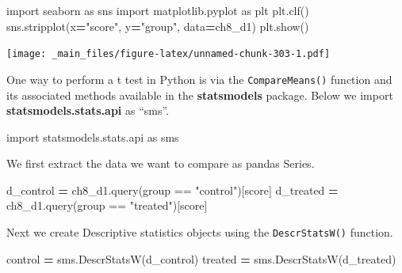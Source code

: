 \documentclass[
]{book}
\newenvironment{Shaded}{\begin{snugshade}}{\end{snugshade}}
\newcommand{\ImportTok}[1]{#1}
\newcommand{\NormalTok}[1]{#1}
\newcommand{\OperatorTok}[1]{\textcolor[rgb]{0.81,0.36,0.00}{\textbf{#1}}}
\newcommand{\StringTok}[1]{\textcolor[rgb]{0.31,0.60,0.02}{#1}}
\begin{document}
\begin{Shaded}
\begin{Highlighting}[]
\ImportTok{import}\NormalTok{ seaborn }\ImportTok{as}\NormalTok{ sns}
\ImportTok{import}\NormalTok{ matplotlib.pyplot }\ImportTok{as}\NormalTok{ plt}
\NormalTok{plt.clf()}
\NormalTok{sns.stripplot(x}\OperatorTok{=}\StringTok{"score"}\NormalTok{, y}\OperatorTok{=}\StringTok{"group"}\NormalTok{, data}\OperatorTok{=}\NormalTok{ch8\_d1)}
\NormalTok{plt.show()}
\end{Highlighting}
\end{Shaded}

\texttt{[image: \_main\_files/figure-latex/unnamed-chunk-303-1.pdf]}

One way to perform a t test in Python is via the \texttt{CompareMeans()} function and its associated methods available in the \textbf{statsmodels} package. Below we import \textbf{statsmodels.stats.api} as ``sms''.

\begin{Shaded}
\begin{Highlighting}[]
\ImportTok{import}\NormalTok{ statsmodels.stats.api }\ImportTok{as}\NormalTok{ sms}
\end{Highlighting}
\end{Shaded}

We first extract the data we want to compare as pandas Series.

\begin{Shaded}
\begin{Highlighting}[]
\NormalTok{d\_control }\OperatorTok{=}\NormalTok{ ch8\_d1.query(}\StringTok{\textquotesingle{}group == "control"\textquotesingle{}}\NormalTok{)[}\StringTok{\textquotesingle{}score\textquotesingle{}}\NormalTok{]}
\NormalTok{d\_treated }\OperatorTok{=}\NormalTok{ ch8\_d1.query(}\StringTok{\textquotesingle{}group == "treated"\textquotesingle{}}\NormalTok{)[}\StringTok{\textquotesingle{}score\textquotesingle{}}\NormalTok{]}
\end{Highlighting}
\end{Shaded}

Next we create Descriptive statistics objects using the \texttt{DescrStatsW()} function.

\begin{Shaded}
\begin{Highlighting}[]
\NormalTok{control }\OperatorTok{=}\NormalTok{ sms.DescrStatsW(d\_control)}
\NormalTok{treated }\OperatorTok{=}\NormalTok{ sms.DescrStatsW(d\_treated)}
\end{Highlighting}
\end{Shaded}
\end{document}
